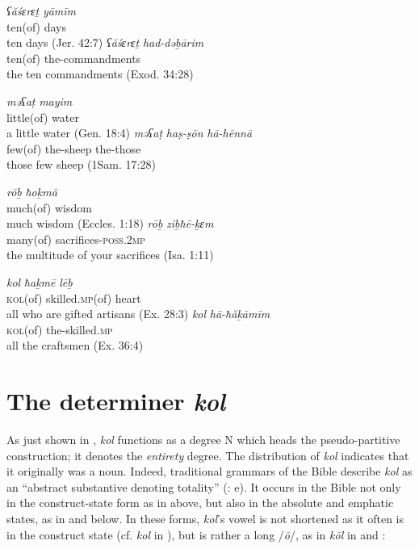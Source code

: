 \documentclass[output=paper]{langsci/langscibook}
\begin{document}
\ea%
    \label{ex:doron:7}
    \ea
    \gll \textit{ʕăśɛrɛṯ}     \textit{yāmīm}\\
         ten(of)    days\\
    \glt ten days (Jer. 42:7)  
    \ex
    \gll \textit{ʕăśɛrɛṯ}    \textit{had-dəḇārim}\\
            ten(of)    the-commandments\\
    \glt the ten commandments (Exod. 34:28)
    \z
\z



\ea%
    \label{ex:doron:8}
    \ea
    \gll \textit{məʕaṭ}      \textit{mayim}\\
         little(of)  water\\
    \glt a little water (Gen. 18:4)
    \ex
    \gll  \textit{məʕaṭ}     \textit{haṣ-ṣōn}     \textit{hā-hēnnā}\\
         few(of)  the-sheep  the-those\\
    \glt those few sheep (1Sam. 17:28)
    \z
\z
        

\ea%
    \label{ex:doron:9}
    \ea
    \gll \textit{rōḇ}          \textit{ħoḵmā}\\
         much(of) wisdom\\
    \glt much wisdom (Eccles. 1:18)
    \ex  
    \gll \textit{rōḇ}           \textit{ziḇħē-ḵɛm}\\
         many(of)  sacrifices-\textsc{poss.2mp}\\
    \glt the multitude of your sacrifices (Isa. 1:11)
    \z
\z

    

\ea%
    \label{ex:doron:10}
    \ea
    \gll \textit{kol}          \textit{ħaḵmē}             \textit{lēḇ}\\
         \textsc{kol}(of)  skilled.\textsc{mp}(of) heart  \\
    \glt all who are gifted artisans (Ex. 28:3)
    \ex  
    \gll \textit{kol}\textsc{\textsubscript{} }         \textit{hā-ħăḵāmīm}   \\
         \textsc{kol}(of)  the-skilled.\textsc{mp}  \\
    \glt all the craftsmen (Ex. 36:4)
    \z
\z

\section{The determiner \textit{kol}}%

As just shown in , \textit{kol} functions as a degree N which heads the pseudo-partitive construction; it denotes the \textit{entirety} degree. The distribution of \textit{kol} indicates that it originally was a noun. Indeed, traditional grammars of the Bible describe \textit{kol} as an “abstract substantive denoting totality” (\citealt{Joüon1923}: e). It occurs in the Bible not only in the construct-state form as in  above, but also in the absolute and emphatic states, as in  and  below. In these forms, \textit{kol}’s vowel is not shortened as it often is in the construct state (cf. \textit{kol} in ), but is rather a long /\textit{ō}/, as in \textit{kōl} in  and :
\end{document}
